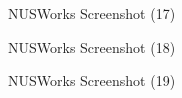 \documentclass[fyp]{socreport}
\begin{document}
\begin{figure}
\caption{NUSWorks Screenshot (17)}
\label{screen-17}
\end{figure}

\begin{figure}
\caption{NUSWorks Screenshot (18)}
\label{screen-18}
\end{figure}

\begin{figure}
\caption{NUSWorks Screenshot (19)}
\label{screen-19}
\end{figure}
\end{document}
